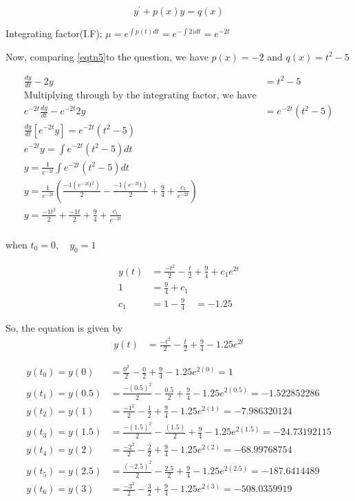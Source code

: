 \documentclass[12pt,a4paper]{article}
\begin{document}
\begin{equation}\label{eqtn5}\tag{5}
y^\prime + p(x)y = q(x) 
\end{equation}

Integrating factor(I.F): $\mu = e^{\int p(t)dt} = e^{-\int 2)dt} = e^{-2t}$

Now, comparing \ref{eqtn5}to the question, we have $p(x) = -2$ and $q(x) = t^2 - 5$

\begin{align*}
\frac{dy}{dt} - 2y &= t^2 -5\\
\text{Multiplying through by the integrating factor, we have}\\
e^{-2t}\frac{dy}{dt} - e^{-2t}2y &= e^{-2t}\left( t^2 -5\right) \\
\frac{dy}{dt}\left[e^{-2t}y\right] = e^{-2t}\left( t^2 -5\right) \\
e^{-2t}y = \int e^{-2t}\left( t^2 -5\right) dt \\
y = \frac{1}{e^{-2t}}\int e^{-2t}\left( t^2 -5\right) dt \\
y = \frac{1}{e^{-2t}} \left(  \frac{-1(e^{-2t} t^2)}{2} - \frac{-1(e^{-2t} t)}{2} + \frac{9}{4}+ \frac{c_1}{e^{-2t}} \right) \\
y = \frac{-1 t^2}{2} + \frac{-1 t}{2} + \frac{9}{4} + \frac{c_1}{e^{-2t}} \\
\end{align*}

when $t_0 = 0, \quad y_0 = 1$

\begin{align*}
y(t) &= \frac{-t^2}{2} - \frac{t}{2} + \frac{9}{4} + c_1 e^{2t} \\
1 &= \frac{9}{4} + c_1 \\
c_1 &= 1 - \frac{9}{4} \quad = -1.25
\end{align*}

So, the equation is given by 
\begin{align*}
y(t) &= \frac{-t^2}{2} - \frac{t}{2} + \frac{9}{4} - 1.25e^{2t}
\end{align*}

\begin{align*}
y(t_0) = y(0) &= \frac{0^2}{2} - \frac{0}{2} + \frac{9}{4} - 1.25e^{2(0)} = 1\\
y(t_1) = y(0.5) &= \frac{-(0.5)^2}{2} - \frac{0.5}{2} + \frac{9}{4} - 1.25e^{2(0.5)} = -1.522852286\\
y(t_2) = y(1) &= \frac{-1^2}{2} - \frac{1}{2} + \frac{9}{4} - 1.25e^{2(1)} = -7.986320124 \\
y(t_3) = y(1.5) &= \frac{-(1.5)^2}{2} - \frac{(1.5)}{2} + \frac{9}{4} - 1.25e^{2(1.5)} = -24.73192115 \\
y(t_4)= y(2) &= \frac{-2^2}{2} - \frac{2}{2} + \frac{9}{4} - 1.25e^{2(2)} = -68.99768754 \\
y(t_5) = y(2.5) &= \frac{(-2.5)^2}{2} - \frac{2.5}{2} + \frac{9}{4} - 1.25e^{2(2.5)} = -187.6414489 \\
y(t_6) = y(3) &= \frac{-3^2}{2} - \frac{3}{2} + \frac{9}{4} - 1.25e^{2(3)} = -508.0359919
\end{align*}
\end{document}
